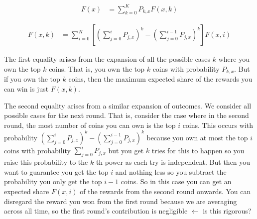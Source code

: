 \documentclass[11pt, oneside]{article}   	%
\begin{document}
\begin{align*}
F(x) &= \sum_{k=0}^K P_{k, x} F(x, k)
\end{align*}

\begin{align*}
F(x, k) &= \sum_{i=0}^K \left[\left(\sum_{j=0}^i P_{j, x}\right)^k - \left( \sum_{j=0}^{i-1} P_{j, x} \right)^k\right]F(x, i)
\end{align*}

The first equality arises from the expansion of all the possible cases $k$ where you own the top $k$ coins. That is, you own the top $k$ coins with probability $P_{k, x}$. But if you own the top $k$ coins, then the maximum expected share of the rewards you can win is just $F(x, k)$.

The second equality arises from a similar expansion of outcomes. We consider all possible cases for the next round. That is, consider the case where in the second round, the most number of coins you can own is the top $i$ coins. This occurs with probability $\left(\sum_{j=0}^i P_{j, x}\right)^k - \left( \sum_{j=0}^{i-1} P_{j, x} \right)^k$ because you own at most the top $i$ coins with probability $\sum_{j=0}^i P_{j, x}$ but you get $k$ tries for this to happen so you raise this probability to the $k$-th power as each try is independent. But then you want to guarantee you get the top $i$ and nothing less so you subtract the probability you only get the top $i-1$ coins. So in this case you can get an expected share $F(x, i)$ of the rewards from the second round onwards. You can disregard the reward you won from the first round because we are averaging across all time, so the first round's contribution is negligible $\leftarrow$ is this rigorous?
\end{document}
